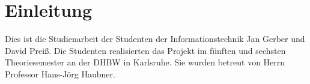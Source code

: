 \chapter{Einleitung}
Dies ist die Studienarbeit der Studenten der Informationstechnik Jan Gerber und David Preiß. Die Studenten realisierten das Projekt im fünften und sechsten Theoriesemester an der DHBW in Karlsruhe. Sie wurden betreut von Herrn Professor Hans-Jörg Haubner.




